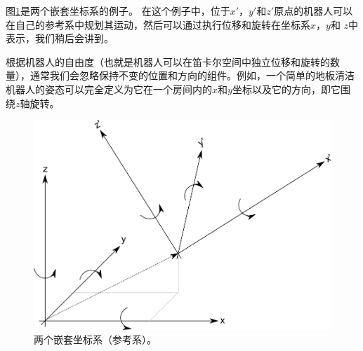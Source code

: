 
图\ref{fig:nestedcoords}是两个嵌套坐标系的例子。 在这个例子中，位于$ x'$，$y'$和$ z'$原点的机器人可以在自己的参考系中规划其运动，然后可以通过执行位移和旋转在坐标系$ x $，$ y $和 $ z $中表示，我们稍后会讲到。


根据机器人的自由度（也就是机器人可以在笛卡尔空间中独立位移和旋转的数量），通常我们会忽略保持不变的位置和方向的组件。例如，一个简单的地板清洁机器人的姿态可以完全定义为它在一个房间内的$ x $和$ y $坐标以及它的方向，即它围绕$ z $轴旋转。

\begin{figure}
	\centering
		\includegraphics[width=\textwidth]{figs/frameofreference.png}
	\caption{两个嵌套坐标系（参考系）。}
	\label{fig:nestedcoords}
\end{figure}

